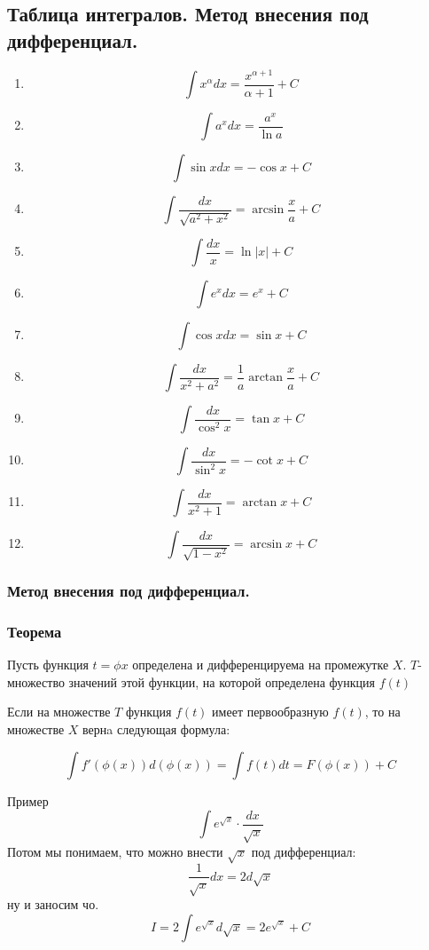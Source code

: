 \documentclass[a4paper,12pt]{article}
\theoremstyle{plain} %
\theoremstyle{definition} %
\theoremstyle{remark} %
\begin{document}
\newpage
\subsection*{Таблица интегралов. Метод внесения под дифференциал.}

\begin{enumerate}
	\item \[ \int x^{\alpha} dx = \frac{x^{\alpha + 1}}{\alpha + 1} + C \]
	\item \[ \int a^x dx = \frac{a^x}{\ln a} \]
	\item \[ \int \sin x dx = - \cos x + C \]
	\item \[ \int \frac{dx}{\sqrt{a^2 + x^2}} = \arcsin \frac{x}{a} + C \]
	\item \[ \int \frac{dx}{x} = \ln |x| +C \]
	\item \[ \int e^x dx = e^x + C \]
	\item \[ \int \cos x dx = \sin x + C \]
	\item \[ \int \frac{dx}{x^2 + a^2} = \frac{1}{a} \arctan \frac{x}{a} +C \]
	\item \[ \int \frac{dx}{\cos^2x} = \tan x + C \]
	\item \[ \int \frac{dx}{\sin^2x} = - \cot x + C \]
	\item \[ \int \frac{dx}{x^2 + 1} = \arctan x + C \]
	\item \[ \int \frac{dx}{\sqrt{1 - x^2}} = \arcsin x + C \]
\end{enumerate}

\subsubsection*{Метод внесения под дифференциал.}

\subsubsection*{Теорема}
Пусть функция $t = \phi{x}$ определена и дифференцируема на промежутке $X$. $T$- множество значений этой функции, на которой определена функция $f(t)$

Если на множестве $T$ функция $f(t)$ имеет первообразную $f(t)$, то на множестве $X$ вернa следующая формула:

\[
	\int f'(\phi(x)) d(\phi(x)) = \int f(t) dt = F(\phi(x)) + C
\]

Пример
\[
	\int e^{\sqrt{x}} \cdot \frac{dx}{\sqrt{x}}
\]
Потом мы понимаем, что можно внести $\sqrt{x}$ под дифференциал:
\[
	\frac{1}{\sqrt{x}} dx = 2d\sqrt{x}
\]
ну и заносим чо.
\[
	I = 2 \int e^{\sqrt{x}} d \sqrt{x} = 2 e^{\sqrt{x}} + C
\]
\end{document}
